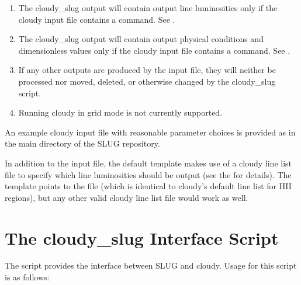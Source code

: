 \documentclass[letterpaper,10pt,english]{sphinxmanual}
\begin{document}
\begin{enumerate}
\item {} 
The cloudy\_slug output will contain output line luminosities only
if the cloudy input file contains a  command. See {\hyperref[\detokenize{cloudy:ssec-cloudy-output}]{}}.

\item {} 
The cloudy\_slug output will contain output physical conditions and
dimensionless values only if the cloudy input file contains a
 command. See
{\hyperref[\detokenize{cloudy:ssec-cloudy-output}]{}}.

\item {} 
If any other outputs are produced by the input file, they will
neither be processed nor moved, deleted, or otherwise changed by
the cloudy\_slug script.

\item {} 
Running cloudy in grid mode is not currently supported.

\end{enumerate}

An example cloudy input file with reasonable parameter choices is
provided as  in the main directory
of the SLUG repository.

In addition to the input file, the default template makes use of a
cloudy line list file to specify which line luminosities should be
output (see the  for
details). The template points to the file
 (which is identical to cloudy’s
default line list for HII regions), but any other valid cloudy line
list file would work as well.


\section{The cloudy\_slug Interface Script}
\label{\detokenize{cloudy:ssec-cloudy-slug-options}}\label{\detokenize{cloudy:the-cloudy-slug-interface-script}}
The  script provides the interface between SLUG and
cloudy. Usage for this script is as follows:
\end{document}

